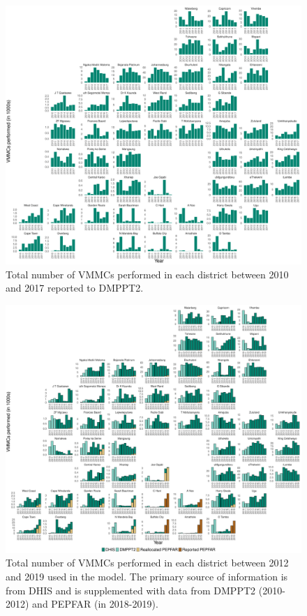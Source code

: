 \documentclass{article}
\begin{document}
\begin{appendix}

\begin{figure}[H]
	\centering
	\includegraphics[width = \linewidth]{Figures/suppmat/IDA/NumMMC_DMPPT2_District.pdf}
	\caption{Total number of VMMCs performed in each district between 2010 and 2017 reported to DMPPT2.}
\end{figure}


\begin{figure}[H]
	\centering
	\includegraphics[width = \linewidth]{Figures/suppmat/IDA/NumMMC_Model_District}
	\caption{Total number of VMMCs performed in each district between 2012 and 2019 used in the model. The primary source of information is from DHIS and is supplemented with data from DMPPT2 (2010-2012) and PEPFAR (in 2018-2019).}
\end{figure}


\end{appendix}
\end{document}
